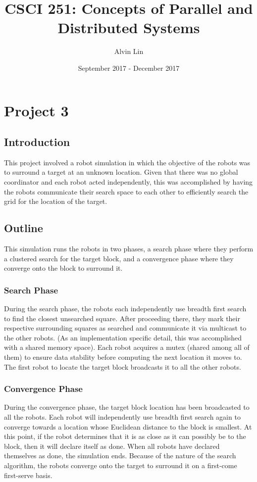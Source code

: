 \documentclass{math}
\title{CSCI 251: Concepts of Parallel and Distributed Systems}
\author{Alvin Lin}
\date{September 2017 - December 2017}
\begin{document}
\maketitle

\section*{Project 3}

\subsection*{Introduction}
This project involved a robot simulation in which the objective of the robots
was to surround a target at an unknown location. Given that there was no global
coordinator and each robot acted independently, this was accomplished by having
the robots communicate their search space to each other to efficiently search
the grid for the location of the target.

\subsection*{Outline}
This simulation runs the robots in two phases, a search phase where they perform
a clustered search for the target block, and a convergence phase where they
converge onto the block to surround it.

\subsubsection*{Search Phase}
During the search phase, the robots each independently use breadth first search
to find the closest unsearched square. After proceeding there, they mark their
respective surrounding squares as searched and communicate it via multicast to
the other robots. (As an implementation specific detail, this was accomplished
with a shared memory space). Each robot acquires a mutex (shared among all of
them) to ensure data stability before computing the next location it moves to.
The first robot to locate the target block broadcasts it to all the other
robots.

\subsubsection*{Convergence Phase}
During the convergence phase, the target block location has been broadcasted to
all the robots. Each robot will independently use breadth first search again to
converge towards a location whose Euclidean distance to the block is smallest.
At this point, if the robot determines that it is as close as it can possibly
be to the block, then it will declare itself as done. When all robots have
declared themselves as done, the simulation ends. Because of the nature of the
search algorithm, the robots converge onto the target to surround it on a
first-come first-serve basis.
\end{document}
